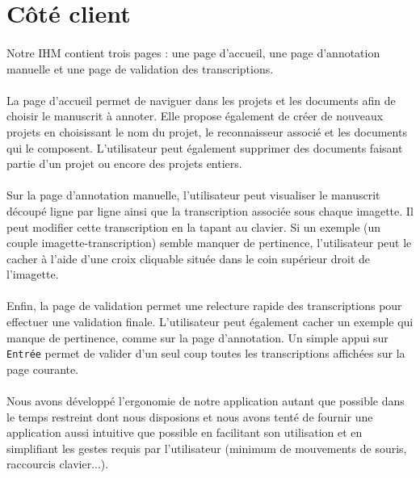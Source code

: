 \section{Côté client}
\paragraph{}
Notre IHM contient trois pages : une page d'accueil, une page d'annotation manuelle et une page de validation des transcriptions.
\paragraph{}
La page d'accueil permet de naviguer dans les projets et les documents afin de choisir le manuscrit à annoter. Elle propose également de créer de nouveaux projets en choisissant le nom du projet, le reconnaisseur associé et les documents qui le composent. L'utilisateur peut également supprimer des documents faisant partie d'un projet ou encore des projets entiers.
\paragraph{}
Sur la page d'annotation manuelle, l'utilisateur peut visualiser le manuscrit découpé ligne par ligne ainsi que la transcription associée sous chaque imagette. Il peut modifier cette transcription en la tapant au clavier. Si un exemple (un couple imagette-transcription) semble manquer de pertinence, l'utilisateur peut le cacher à l'aide d'une croix cliquable située dans le coin supérieur droit de l'imagette.
\paragraph{}
Enfin, la page de validation permet une relecture rapide des transcriptions pour effectuer une validation finale. L'utilisateur peut également cacher un exemple qui manque de pertinence, comme sur la page d'annotation. Un simple appui sur \texttt{Entrée} permet de valider d'un seul coup toutes les transcriptions affichées sur la page courante.

\paragraph{}
Nous avons développé l'ergonomie de notre application autant que possible dans le temps restreint dont nous disposions et nous avons tenté de fournir une application aussi intuitive que possible en facilitant son utilisation et en simplifiant les gestes requis par l'utilisateur (minimum de mouvements de souris, raccourcis clavier...).
